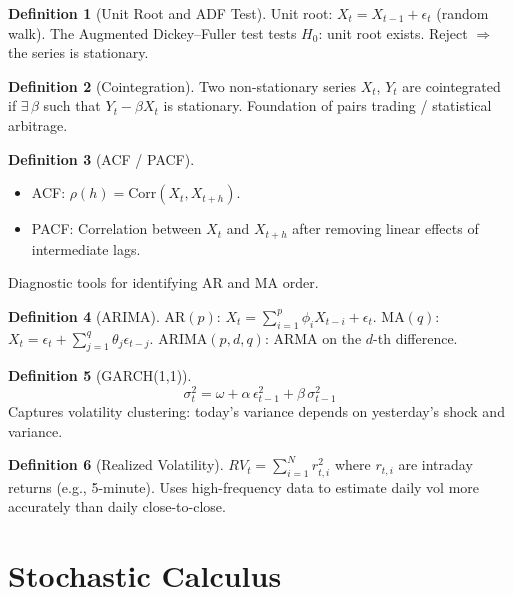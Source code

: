 \documentclass[a4paper, 11pt]{report}
\theoremstyle{definition}
\newtheorem{definition}{Definition}[chapter]
\theoremstyle{remark}
\begin{document}
\begin{definition}[Unit Root and ADF Test]
    Unit root: $X_t = X_{t-1} + \epsilon_t$ (random walk).  The Augmented
    Dickey--Fuller test tests $H_0$: unit root exists.  Reject $\Rightarrow$
    the series is stationary.
\end{definition}

\begin{definition}[Cointegration]
    Two non-stationary series $X_t$, $Y_t$ are cointegrated if
    $\exists\,\beta$ such that $Y_t - \beta X_t$ is stationary.
    Foundation of pairs trading / statistical arbitrage.
\end{definition}

\begin{definition}[ACF / PACF]
    \begin{itemize}
        \item ACF: $\rho(h) = \text{Corr}(X_t, X_{t+h})$.
        \item PACF: Correlation between $X_t$ and $X_{t+h}$ after removing
              linear effects of intermediate lags.
    \end{itemize}
    Diagnostic tools for identifying AR and MA order.
\end{definition}

\begin{definition}[ARIMA]
    $\text{AR}(p)$: $X_t = \sum_{i=1}^p \phi_i X_{t-i} + \epsilon_t$. \quad
    $\text{MA}(q)$: $X_t = \epsilon_t + \sum_{j=1}^q \theta_j \epsilon_{t-j}$. \quad
    $\text{ARIMA}(p,d,q)$: ARMA on the $d$-th difference.
\end{definition}

\begin{definition}[GARCH(1,1)]
    \[
        \sigma_t^2 = \omega + \alpha\,\epsilon_{t-1}^2 + \beta\,\sigma_{t-1}^2
    \]
    Captures volatility clustering: today's variance depends on yesterday's
    shock and variance.
\end{definition}

\begin{definition}[Realized Volatility]
    $RV_t = \sum_{i=1}^N r_{t,i}^2$ where $r_{t,i}$ are intraday returns
    (e.g., 5-minute).  Uses high-frequency data to estimate daily vol more
    accurately than daily close-to-close.
\end{definition}


\section{Stochastic Calculus}
\label{sec:math-stoch}
\end{document}

